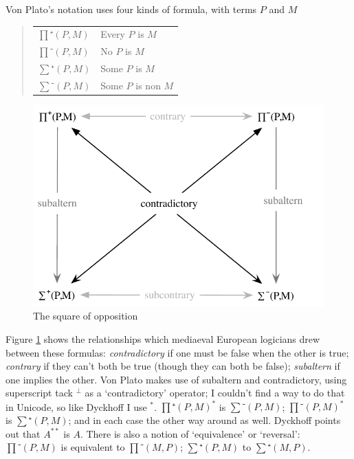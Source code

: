 Von Plato's notation uses four kinds of formula, with terms $P$ and $M$
\begin{quote}
\begin{tabular}{ll}
$∏⁺(P,M)$ & Every $P$ is $M$ \\
$∏⁻(P,M)$ & No $P$ is $M$ \\
$∑⁺(P,M)$ & Some $P$ is $M$ \\
$∑⁻(P,M)$ & Some $P$ is non $M$ \\
\end{tabular}
\end{quote}
\begin{figure}[b]
\centering
\includegraphics[scale=0.5]{pics/Aristotle/square_of_opposition}
\caption{The square of opposition}
\label{fig:Aristotle:square_of_opposition}
\end{figure}
Figure \ref{fig:Aristotle:square_of_opposition} shows the relationships which mediaeval European logicians drew between these formulas: \emph{contradictory} if one must be false when the other is true; \emph{contrary} if they can't both be true (though they can both be false); \emph{subaltern} if one implies the other. Von Plato makes use of subaltern and contradictory, using superscript tack $^{⊥}$ as a `contradictory' operator; I couldn't find a way to do that in Unicode, so like Dyckhoff I use $^{*}$. $∏⁺(P,M)^{*}$ is $∑⁻(P,M)$; $∏⁻(P,M)^{*}$ is $∑⁺(P,M)$; and in each case the other way around as well. Dyckhoff points out that $A^{{*}{*}}$ is $A$. There is also a notion of `equivalence' or `reversal': $∏⁻(P,M)$ is equivalent to $∏⁻(M,P)$; $∑⁺(P,M)$ to $∑⁺(M,P)$.

